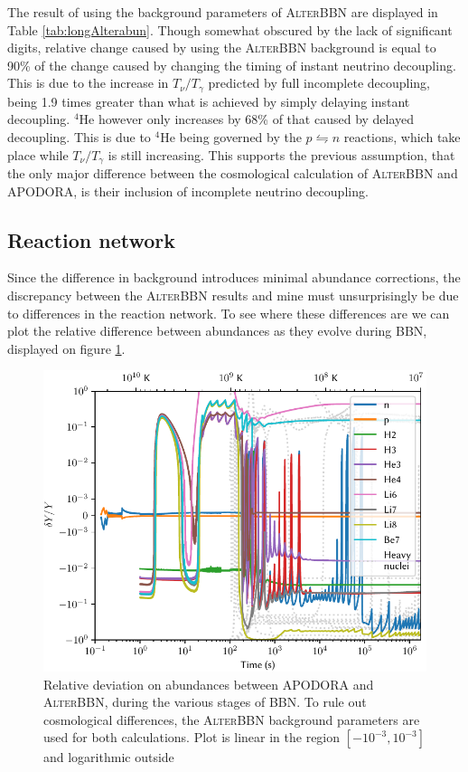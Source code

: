 The result of using the background parameters of \textsc{AlterBBN} are displayed in Table \ref{tab:longAlterabun}. Though somewhat obscured by the lack of significant digits, relative change caused by using the \textsc{AlterBBN} background is equal to 90\% of the change caused by changing the timing of instant neutrino decoupling. This is due to the increase in $T_\nu/T_\gamma$ predicted by full incomplete decoupling, being 1.9 times greater than what is achieved by simply delaying instant decoupling. ${}^4$He however only increases by 68\% of that caused by delayed decoupling. This is due to ${}^4$He being governed by the $p\leftrightharpoons n$ reactions, which take place while $T_\nu/T_\gamma$ is still increasing. This supports the previous assumption, that the only major difference between the cosmological calculation of \textsc{AlterBBN} and APODORA, is their inclusion of incomplete neutrino decoupling.

\subsection{Reaction network}

Since the difference in background introduces minimal abundance corrections, the discrepancy between the \textsc{AlterBBN} results and mine must unsurprisingly be due to differences in the reaction network. To see where these differences are we can plot the relative difference between abundances as they evolve during BBN, displayed on figure \ref{fig:AlterBBNdeltaY}. 
\begin{figure}[ht]
    \includegraphics[width=5.1in]{figures/AlterBBNdeltaY.pdf}
    \caption{Relative deviation on abundances between APODORA and \textsc{AlterBBN}, during the various stages of BBN. To rule out cosmological differences, the \textsc{AlterBBN} background parameters are used for both calculations. Plot is linear in the region $[-10^{-3},10^{-3}]$ and logarithmic outside}
    \label{fig:AlterBBNdeltaY}
\end{figure}


